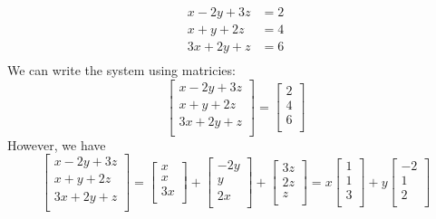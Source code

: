 \documentclass{article}
\begin{document}
\begin{examples}
  \begin{align*}
    x - 2y + 3z &= 2\\
    x + y + 2z &= 4\\
    3x + 2y + z &= 6\\
  \end{align*}
  We can write the system using matricies:
  \[
    \begin{bmatrix}
      x - 2y + 3z\\
      x + y + 2z\\
      3x + 2y + z\\
    \end{bmatrix}
    =
    \begin{bmatrix}
      2\\
      4\\
      6\\
    \end{bmatrix}
  \]
  However, we have
  \[
    \begin{bmatrix}
      x - 2y + 3z\\
      x + y + 2z\\
      3x + 2y + z\\
    \end{bmatrix}
    =
    \begin{bmatrix}
      x\\
      x\\
      3x\\
    \end{bmatrix}
    +
    \begin{bmatrix}
      -2y\\
      y\\
      2x\\
    \end{bmatrix}
    +
    \begin{bmatrix}
      3z\\
      2z\\
      z\\
    \end{bmatrix}
    =x
    \begin{bmatrix}
      1\\
      1\\
      3\\
    \end{bmatrix}
    +y
    \begin{bmatrix}
      -2\\
      1\\
      2\\
    \end{bmatrix}
\]
\end{examples}
\end{document}

